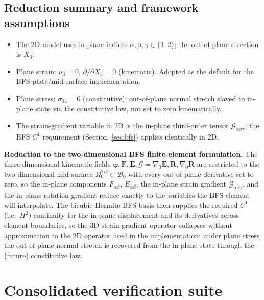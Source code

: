 \documentclass[11pt]{article}
\newcommand{\gradz}{\nabla_{0}}
\newcommand{\bp}{\boldsymbol{\varphi}}
\newcommand{\bF}{\mathbf{F}}
\newcommand{\bE}{\mathbf{E}}
\newcommand{\bR}{\mathbf{R}}
\newcommand{\gradz}{\nabla_{0}}
\newcommand{\bp}{\boldsymbol{\varphi}}
\newcommand{\bF}{\mathbf{F}}
\newcommand{\bE}{\mathbf{E}}
\newcommand{\bR}{\mathbf{R}}
\begin{document}
\subsection{Reduction summary and framework assumptions}

\begin{itemize}
\item[A7] The 2D model uses in-plane indices $\alpha,\beta,\gamma\in
\{1,2\}$; the out-of-plane direction is $X_{3}$.

\item[A8] Plane strain: $u_{3}=0$, $\partial/\partial X_{3}=0$
(kinematic). Adopted as the default for the BFS plate/mid-surface
implementation.

\item[A9] Plane stress: $\sigma_{33}=0$ (constitutive); out-of-plane
normal stretch slaved to in-plane state via the constitutive law, not
set to zero kinematically.

\item The strain-gradient variable in 2D is the in-plane third-order
tensor $\mathcal{G}_{\alpha\beta\gamma}$; the BFS $C^{1}$ requirement
(Section~\ref{sec:bfs}) applies identically in 2D.
\end{itemize}

\noindent\textbf{Reduction to the two-dimensional BFS finite-element
formulation.} The three-dimensional kinematic fields
$\bp,\bF,\bE,\bm{\mathcal{G}}=\gradz\bE,\bR,\gradz\bR$ are restricted to the
two-dimensional mid-surface $\Omega_{0}^{2D}\subset\mathcal{B}_{0}$ with
every out-of-plane derivative set to zero, so the in-plane components
$F_{\alpha\beta}$, $E_{\alpha\beta}$, the in-plane strain gradient
$\mathcal{G}_{\alpha\beta\gamma}$, and the in-plane rotation-gradient reduce
exactly to the variables the BFS element will interpolate. The
bicubic-Hermite BFS basis then supplies the required $C^{1}$ (i.e.\
$H^{2}$) continuity for the in-plane displacement and its derivatives
across element boundaries, so the 3D strain-gradient operator collapses
without approximation to the 2D operator used in the implementation;
under plane stress the out-of-plane normal stretch is recovered from the
in-plane state through the (future) constitutive law.

\section{Consolidated verification suite}
\label{sec:recovery}
\end{document}
